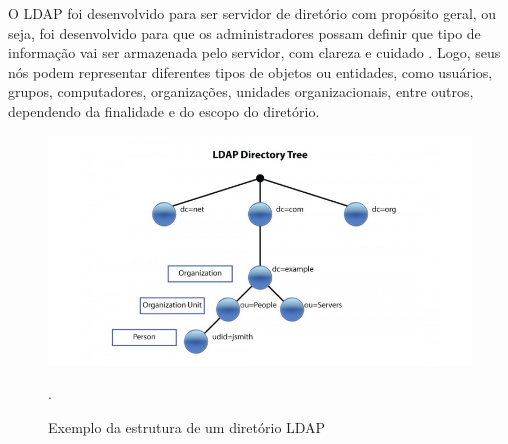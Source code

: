 O LDAP foi desenvolvido para ser servidor de diretório com propósito
geral, ou seja, foi desenvolvido para que os administradores possam
definir que tipo de informação vai ser armazenada pelo servidor, com clareza e
cuidado \cite{lima2021estudo}. Logo, seus nós podem representar diferentes tipos de objetos ou entidades, como usuários, grupos, computadores, organizações, unidades organizacionais, entre outros, dependendo da finalidade e do escopo do diretório.

\begin{figure}[h]
    \centering
	\includegraphics[scale=0.7]{textuais/LDAPTree.png}
	\caption[Exemplo da estrutura de um diretório LDAP]{Exemplo da estrutura de um diretório LDAP}.
	\label{fig:ldaptree}
\end{figure}

